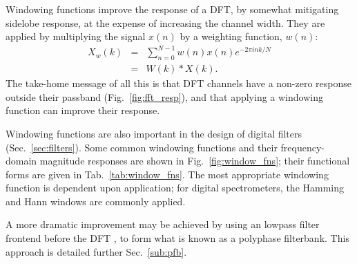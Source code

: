 \documentclass{ws-rv961x669}
\begin{document}
Windowing functions\citet{SvenGade1987} improve the response of a DFT, by somewhat mitigating sidelobe response, at the expense of increasing the channel width. They are applied by multiplying the signal $x(n)$ by a weighting function, $w(n)$:
\begin{eqnarray}
X_w(k) & = & \sum_{n=0}^{N-1}w(n)x(n)e^{-2\pi ink/N} \\
       & = & W(k)*X(k).
\end{eqnarray}
The take-home message of all this is that DFT channels have a non-zero response outside their passband (Fig.~\ref{fig:fft_resp}), and that applying a windowing function can improve their response. 

Windowing functions are also important in the design of digital filters (Sec.~\ref{sec:filters}). Some common windowing functions and their frequency-domain magnitude responses are shown in Fig.~\ref{fig:window_fns}; their functional forms are given in Tab.~\ref{tab:window_fns}. The most appropriate windowing function is dependent upon application; for digital spectrometers, the Hamming and Hann windows are commonly applied.

A more dramatic improvement may be achieved by using an lowpass filter frontend before the DFT \citep{Bellanger:1976p7898}, to form what is known as a polyphase filterbank. This approach is detailed further Sec.~\ref{sub:pfb}. 


\end{document}
